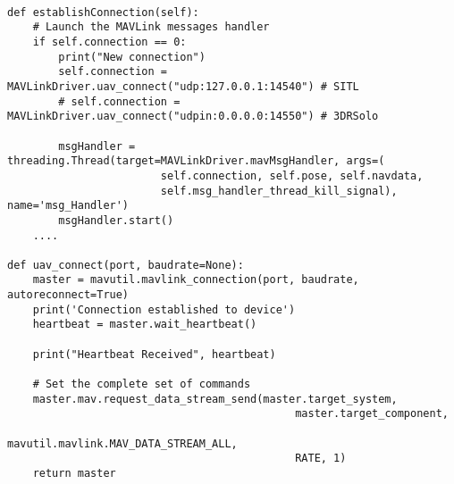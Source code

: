 \begin{verbatim}

def establishConnection(self):
    # Launch the MAVLink messages handler
    if self.connection == 0:
        print("New connection")
        self.connection = MAVLinkDriver.uav_connect("udp:127.0.0.1:14540") # SITL
        # self.connection = MAVLinkDriver.uav_connect("udpin:0.0.0.0:14550") # 3DRSolo

        msgHandler = threading.Thread(target=MAVLinkDriver.mavMsgHandler, args=(
                        self.connection, self.pose, self.navdata,
                        self.msg_handler_thread_kill_signal), name='msg_Handler')
        msgHandler.start()
    ....

def uav_connect(port, baudrate=None):
    master = mavutil.mavlink_connection(port, baudrate, autoreconnect=True)
    print('Connection established to device')
    heartbeat = master.wait_heartbeat()
    
    print("Heartbeat Received", heartbeat)

    # Set the complete set of commands
    master.mav.request_data_stream_send(master.target_system, 
                                             master.target_component,
                                             mavutil.mavlink.MAV_DATA_STREAM_ALL,
                                             RATE, 1)
    return master
    
\end{verbatim}